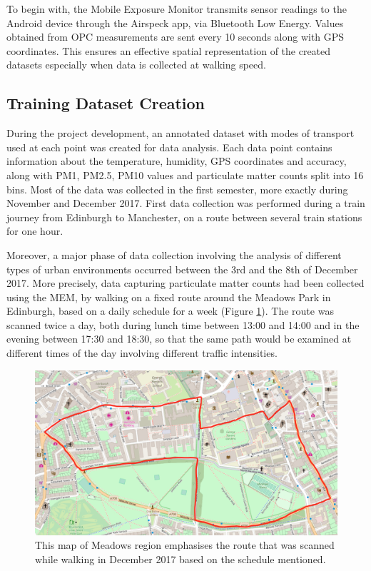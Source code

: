 \documentclass[bsc,frontabs,twoside,singlespacing, parskip,deptreport]{infthesis}     %
\begin{document}
To begin with, the Mobile Exposure Monitor transmits sensor readings to the Android device through the Airspeck app, via Bluetooth Low Energy. Values obtained from OPC measurements are sent every 10 seconds along with GPS coordinates. This ensures an effective spatial representation of the created datasets especially when data is collected at walking speed.

\subsection{Training Dataset Creation}
\label{subsec:training-dataset}

During the project development, an annotated dataset with modes of transport used at each point was created for data analysis. Each data point contains information about the temperature, humidity, GPS coordinates and accuracy, along with PM1, PM2.5, PM10 values and particulate matter counts split into 16 bins. Most of the data was collected in the first semester, more exactly during November and December 2017. First data collection was performed during a train journey from Edinburgh to Manchester, on a route between several train stations for one hour.

Moreover, a major phase of data collection involving the analysis of different types of urban environments occurred between the 3rd and the 8th of December 2017. More precisely, data capturing particulate matter counts had been collected using the MEM, by walking on a fixed route around the Meadows Park in Edinburgh, based on a daily schedule for a week (Figure \ref{fig:december_route}). The route was scanned twice a day, both during lunch time between 13:00 and 14:00 and in the evening between 17:30 and 18:30, so that the same path would be examined at different times of the day involving different traffic intensities.

\begin{figure}[h]
  \center
  \includegraphics[width=\columnwidth]{december_route.png} 
  \caption{This map of Meadows region emphasises the route that was scanned while walking in December 2017 based on the schedule mentioned.}
  \label{fig:december_route}
\end{figure}
\end{document}
